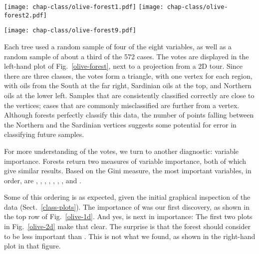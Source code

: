 \begin{figure*}[h]
\centerline{
  {\texttt{[image: chap-class/olive-forest1.pdf]}}
  {\texttt{[image: chap-class/olive-forest2.pdf]}}}
\smallskip
\centerline{
  {\texttt{[image: chap-class/olive-forest9.pdf]}}}
\caption[Examining the results of a forest classifier of ]{Examining the results of a forest classifier of  by .  The votes assess the uncertainty associated
with each sample.  The cases classified with the greatest uncertainty
lie far from the corners of the triangles.  These points are brushed
{\bf (top left)}, and we examine their location using the linked tour
plot {\bf (top right)}.  The introduction of  {\bf
(bottom)} eliminates the confusion between Sardinia and the North. }
\label{olive-forest}
\end{figure*}

\noindent Each tree used a random sample of four of the eight
variables, as well as a random sample of about a third of the 572
cases.  The votes are displayed in the left-hand plot of
Fig.~\ref{olive-forest}, next to a projection from a
 2D tour. Since there are three classes, the votes
form a triangle, with one vertex for each region, with oils from the
South at the far right, Sardinian oils at the top, and Northern oils
at the lower left. Samples that are consistently classified correctly
are close to the vertices; cases that are commonly misclassified are
further from a vertex.  Although forests perfectly classify this data,
the number of points falling between the Northern and the Sardinian
vertices suggests some potential for error in classifying future
samples.

For more understanding of the votes, we turn to another diagnostic:
variable importance. Forests return two measures of variable
importance, both of which give similar results. Based on the Gini
measure, the most important variables, in order, are ,
, , , ,
, , and .  

Some of this ordering is as expected, given the initial graphical
inspection of the data (Sect.~\ref{class-plots}).  The importance of
 was our first discovery, as shown in the top row of
Fig.~\ref{olive-1d}.  And yes,  is next in importance:
The first two plots in Fig.~\ref{olive-2d} make that clear.  The
surprise is that the forest should consider  to be less
important than .  This is not what we found, as shown in
the right-hand plot in that figure.

